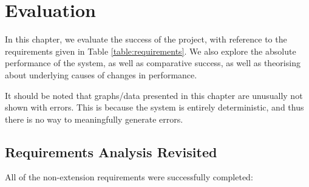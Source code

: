 \documentclass[oneside, class=book, 12pt, crop=false]{standalone}
\begin{document}
\ifstandalone
  \setcounter{chapter}{3}
  \chapter{Evaluation}
\fi
{}

In this chapter, we evaluate the success of the project, with reference to the requirements given in Table \ref{table:requirements}. We also explore the absolute performance of the system, as well as comparative success, as well as theorising about underlying causes of changes in performance. 

It should be noted that graphs/data presented in this chapter are unusually not shown with errors. This is because the system is entirely deterministic, and thus there is no way to meaningfully generate errors.

\section{Requirements Analysis Revisited}

All of the non-extension requirements were successfully completed:
\end{document}
